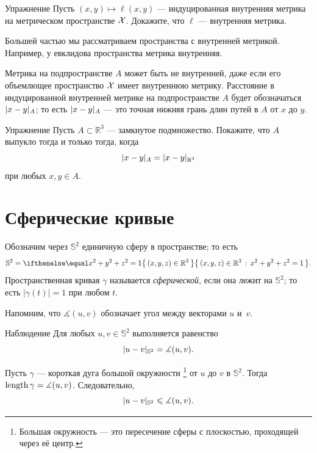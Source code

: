 \begin{thm}{Упражнение}\label{ex:induced-is-length}
Пусть $(x,y)\mapsto \ell(x,y)$ --- индуцированная внутренняя метрика на метрическом пространстве $\mathcal{X}$.
Докажите, что $\ell$ --- внутренняя метрика.
\end{thm}

Большей частью мы рассматриваем пространства с внутренней метрикой.
Например, у евклидова пространства метрика внутренняя.

Метрика на подпространстве $A$ может быть не внутренней, даже если его объемлющее пространство $\mathcal{X}$ имеет внутреннюю метрику.
Расстояние в индуцированной внутренней метрике на подпространстве $A$ будет обозначаться $\dist{x}{y}A$;
то есть $\dist{x}{y}A$ --- это точная нижняя грань длин путей в $A$ от $x$ до $y$.

\begin{thm}{Упражнение}\label{ex:intrinsic-convex}
Пусть $A\subset \mathbb{R}^3$ --- замкнутое подмножество.
Покажите, что $A$ выпукло тогда и только тогда, когда
\[\dist{x}{y}A=\dist{x}{y}{\mathbb{R}^3}\]
при любых $x,y\in A$.
\end{thm}



\section{Сферические кривые}

Обозначим через $\mathbb{S}^2$ единичную сферу в пространстве; то есть
\[\mathbb{S}^2=\set{(x,y,z)\in\mathbb{R}^3}{x^2+y^2+z^2=1}.\]
Пространственная кривая $\gamma$ называется \emph{сферической}, если она лежит на $\mathbb{S}^2$;
то есть $|\gamma(t)|=1$ при любом $t$.

Напомним, что $\measuredangle(u,v)$ обозначает угол между векторами $u$ и~$v$.

\begin{thm}{Наблюдение}\label{obs:S2-length}
Для любых $u,v\in \mathbb{S}^2$ выполняется равенство
\[\dist{u}{v}{\mathbb{S}^2}=\measuredangle(u,v).\]

\end{thm}

Пусть $\gamma$ --- короткая дуга большой окружности%
\footnote{Большая окружность --- это пересечение сферы с плоскостью, проходящей через её центр.}
от $u$ до $v$ в $\mathbb{S}^2$.
Тогда $\mathop{\rm length}\nolimits\gamma=\measuredangle(u,v)$.
Следовательно,
\[\dist{u}{v}{\mathbb{S}^2}\le\measuredangle(u,v).\]

